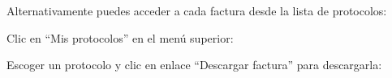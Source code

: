 \documentclass[12pt, spanish]{article}
\begin{document}
\begin{steps}
    \end{steps}

            Alternativamente puedes acceder a cada factura desde la lista de protocolos:

    \begin{steps}

        \item Clic en ``Mis protocolos'' en el menú superior:

            \medskip
            \begin{minipage}[t]{\linewidth}
            \raggedright
        \end{minipage}

        \item Escoger un protocolo y clic en enlace ``Descargar factura'' para descargarla:

            \medskip
            \begin{minipage}[t]{\linewidth}
            \raggedright
        \end{minipage}

    \end{steps}

\end{document}
